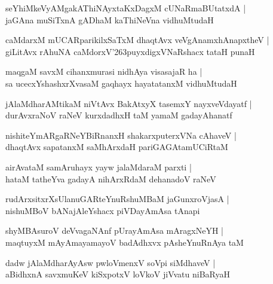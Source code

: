 \documentclass[twoside,12pt,openright]{book}
\def\S{\char'263}
\newcounter{shloka}[chapter]
\begin{document}
\begin{shloka}%
seYhiMkeVyAMgakAThiNAyxtaKxDagxM cUNaRmaBUtatxdA |\\
jaGAna muSiTxnA gADhaM kaThiNeVna vidhuMtudaH
\end{shloka}

\begin{shloka}%
caMdarxM mUCARparikilxSaTxM dhaqtAvx veVgAnamxhAnapxtheV |\\
giLitAvx rAhuNA caMdorxV\S puyxdigxVNaRshacx tataH punaH
\end{shloka}

\begin{shloka}%
maqgaM savxM cihanxmurasi nidhAya visasajaR ha |\\
sa ucecxYshashxrXvasaM gaqhayx hayatatanxM vidhuMtudaH
\end{shloka}

\begin{shloka}%
jAlaMdharAMtikaM niVtAvx BakAtxyX tasemxY nayxveVdayatf |\\
durAvxraNoV raNeV kurxdadhxH taM yamaM gadayAhanatf
\end{shloka}

\begin{shloka}%
nishiteYmARgaRNeYBiRnanxH shakarxputerxVNa cAhaveV |\\
dhaqtAvx sapatanxM saMhArxdaH pariGAGAtamUCiRtaM 
\end{shloka}

\begin{shloka}%
airAvataM samAruhayx yayw jalaMdaraM parxti |\\
hataM tatheYva gadayA nihArxRdaM dehanadoV raNeV 
\end{shloka}

\begin{shloka}%
rudArxsitxrXsUlanuGARteYnuRshuMBaM jaGunxroVjasA |\\
nishuMBoV bANajAleYshacx piVDayAmAsa tAnapi
\end{shloka}

\begin{shloka}%
shyMBAsuroV deVvagaNAnf pUrayAmAsa mAragxNeYH |\\
maqtuyxM mAyAmayamayoV badAdhxvx pAsheYnuRnAya taM 
\end{shloka}

\begin{shloka}%
dadw jAlaMdharAyAsw pwloVmenxV soVpi siMdhaveV |\\
aBidhxnA savxmuKeV kiSxpotxV loVkoV jiVvatu niBaRyaH 
\end{shloka}
\end{document}

